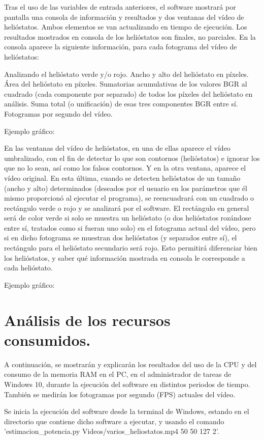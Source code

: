 \documentclass[12pt]{article}
\begin{document}
Tras el uso de las variables de entrada anteriores, el software mostrará por pantalla una consola de información y resultados y dos ventanas del vídeo de helióstatos. Ambos elementos se van actualizando en tiempo de ejecución. Los resultados mostrados en consola de los helióstatos son finales, no parciales. En la consola aparece la siguiente información, para cada fotograma del vídeo de helióstatos:

Analizando el helióstato verde y/o rojo.
Ancho y alto del helióstato en píxeles.
Área del helióstato en píxeles.
Sumatorias acumulativas de los valores BGR al cuadrado (cada componente por separado) de todos los píxeles del helióstato en análisis.
Suma total (o unificación) de esas tres componentes BGR entre sí.
Fotogramas por segundo del vídeo.

Ejemplo gráfico:



En las ventanas del vídeo de helióstatos, en una de ellas aparece el vídeo umbralizado, con el fin de detectar lo que son contornos (helióstatos) e ignorar los que no lo sean, así como los falsos contornos. Y en la otra ventana, aparece el vídeo original. En esta última, cuando se detecten helióstatos de un tamaño (ancho y alto) determinados (deseados por el usuario en los parámetros que él mismo proporcionó al ejecutar el programa), se reencuadrará con un cuadrado o rectángulo verde o rojo y se analizará por el software. El rectángulo en general será de color verde si solo se muestra un helióstato (o dos helióstatos rozándose entre sí, tratados como si fueran uno solo) en el fotograma actual del vídeo, pero si en dicho fotograma se muestran dos helióstatos (y separados entre sí), el rectángulo para el helióstato secundario será rojo. Esto permitirá diferenciar bien los helióstatos, y saber qué información mostrada en consola le corresponde a cada helióstato.

Ejemplo gráfico:

\section{Análisis de los recursos consumidos.}

A continuación, se mostrarán y explicarán los resultados del uso de la CPU y del consumo de la memoria RAM en el PC, en el administrador de tareas de Windows 10, durante la ejecución del software en distintos periodos de tiempo. También se medirán los fotogramas por segundo (FPS) actuales del vídeo.

Se inicia la ejecución del software desde la terminal de Windows, estando en el directorio que contiene dicho software a ejecutar, y usando el comando 'estimacion\_potencia.py Videos/varios\_heliostatos.mp4 50 50 127 2'.
\end{document}
